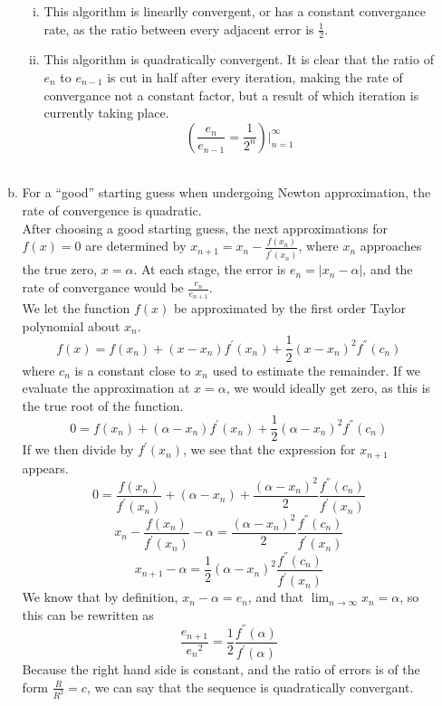 \documentclass[11pt]{article}
\begin{document}
\begin{enumerate}
\begin{enumerate}[(a)]
		\begin{enumerate}[i.]

			\item This algorithm is linearlly convergent, or has a constant convergance rate, as the ratio between every adjacent
			error is $\frac{1}{2}$.

			\item This algorithm is quadratically convergent. It is clear that the ratio of $e_n$ to $e_{n-1}$ is cut in half
			after every iteration, making the rate of convergance not a constant factor, but a result of which iteration is
			currently taking place.
			$$(\frac{e_n}{e_{n-1}} = \frac{1}{2^n})|_{n=1}^{\infty}$$ \\

		\end{enumerate}

		\item For a ``good'' starting guess when undergoing Newton approximation, the rate of convergence is quadratic. \\

			After choosing a good starting guess, the next approximations for $f(x)=0$ are determined by $x_{n+1} = x_n-\frac{f(x_n)}{f^{'}(x_n)}$, where
			$x_n$ approaches the true zero, $x=\alpha$. At each stage, the error is $e_n = |x_n-\alpha|$, and the rate of convergance would be
			$\frac{e_n}{e_{n+1}}$. \\

			We let the function $f(x)$ be approximated by the first order Taylor polynomial about $x_n$.
			$$f(x) = f(x_n) + (x-x_n)f^{'}(x_n) + \frac{1}{2} (x-x_n)^2f^{''}(c_n)$$
			where $c_n$ is a constant close to $x_n$ used to estimate the remainder. If we evaluate the approximation at $x=\alpha$, we would ideally get zero,
			as this is the true root of the function.
			$$0 = f(x_n) + (\alpha - x_n)f^{'}(x_n) + \frac{1}{2} (\alpha-x_n)^2f^{''}(c_n)$$
			If we then divide by $f^{'}(x_n)$, we see that the expression for $x_{n+1}$ appears.
			$$0 = \frac{f(x_n)}{f^{'}(x_n)}+(\alpha-x_n) + \frac{(\alpha-x_n)^2}{2} \frac{f^{''}(c_n)}{f^{'}(x_n)} $$
			$$x_n - \frac{f(x_n)}{f^{'}(x_n)} - \alpha = \frac{(\alpha-x_n)^2}{2} \frac{f^{''}(c_n)}{f^{'}(x_n)} $$
			$$x_{n+1}-\alpha = \frac{1}{2} (\alpha - x_n)^2 \frac{f^{''}(c_n)}{f^{'}(x_n)} $$
			We know that by definition, $x_n-\alpha = e_n$, and that $\lim_{n\to\infty}x_n = \alpha$,  so this can be rewritten as
			$$\frac{e_{n+1}}{{e_n}^2} = \frac{1}{2}\frac{f^{''}(\alpha)}{f^{'}(\alpha)} $$
			Because the right hand side is constant, and the ratio of errors is of the form $\frac{R}{R^2} = c$, we can say that the sequence is
			quadratically convergant. \\


\end{enumerate}
\end{enumerate}
\end{document}
